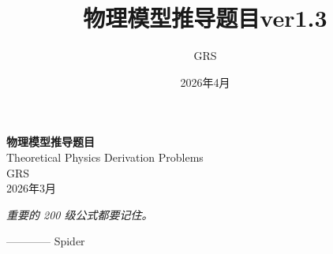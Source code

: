 \documentclass[12pt, a4paper, oneside]{ctexart}
\title{\textbf{物理模型推导题目ver1.3}}
\author{GRS}
\date{2026年4月}
\begin{document}
\begin{titlepage}
    \centering
    \vspace*{2cm}
    {\Huge \bfseries 物理模型推导题目} \\[1cm]
    {\Large Theoretical Physics Derivation Problems} \\[2cm]
    {\Large GRS} \\[0.5cm]
    {\Large 2026年3月} \\[2cm]
\end{titlepage}

\vspace{2cm}
\noindent\textbf{}

\vspace{1cm}
\hfill \begin{minipage}{0.8\textwidth}
\centering
\itshape
重要的 200 级公式都要记住。
\end{minipage}
\begin{flushright}
———— Spider
\end{flushright}
\vspace{2cm}

\newpage

\end{document}
